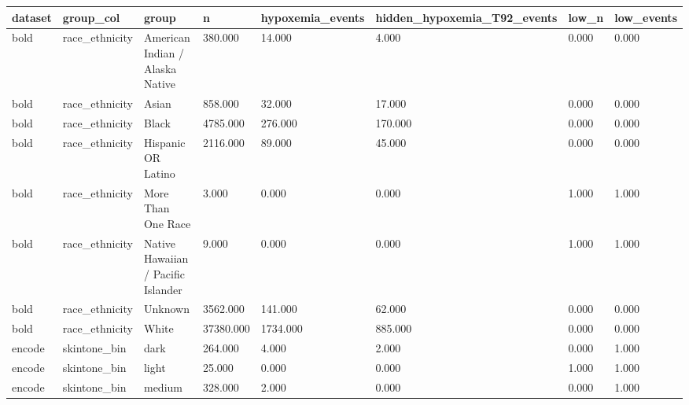 \begin{tabular}{llllllll}
\toprule
dataset & group\_col & group & n & hypoxemia\_events & hidden\_hypoxemia\_T92\_events & low\_n & low\_events \\
\midrule
bold & race_ethnicity & American Indian / Alaska Native & 380.000 & 14.000 & 4.000 & 0.000 & 0.000 \\
bold & race_ethnicity & Asian & 858.000 & 32.000 & 17.000 & 0.000 & 0.000 \\
bold & race_ethnicity & Black & 4785.000 & 276.000 & 170.000 & 0.000 & 0.000 \\
bold & race_ethnicity & Hispanic OR Latino & 2116.000 & 89.000 & 45.000 & 0.000 & 0.000 \\
bold & race_ethnicity & More Than One Race & 3.000 & 0.000 & 0.000 & 1.000 & 1.000 \\
bold & race_ethnicity & Native Hawaiian / Pacific Islander & 9.000 & 0.000 & 0.000 & 1.000 & 1.000 \\
bold & race_ethnicity & Unknown & 3562.000 & 141.000 & 62.000 & 0.000 & 0.000 \\
bold & race_ethnicity & White & 37380.000 & 1734.000 & 885.000 & 0.000 & 0.000 \\
encode & skintone_bin & dark & 264.000 & 4.000 & 2.000 & 0.000 & 1.000 \\
encode & skintone_bin & light & 25.000 & 0.000 & 0.000 & 1.000 & 1.000 \\
encode & skintone_bin & medium & 328.000 & 2.000 & 0.000 & 0.000 & 1.000 \\
\bottomrule
\end{tabular}
